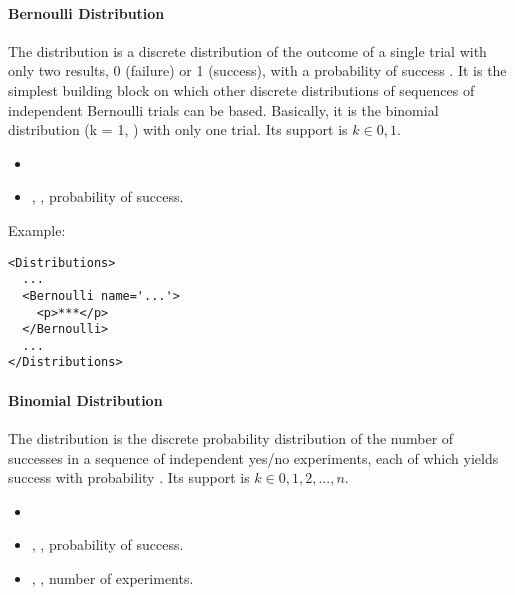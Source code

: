 \paragraph{Bernoulli Distribution}
\label{Bernoulli}
The  distribution is a discrete distribution of the outcome
of a single trial with only two results, 0 (failure) or 1 (success), with a
probability of success .
%
It is the simplest building block on which other discrete distributions of
sequences of independent Bernoulli trials can be based.
%
Basically, it is the binomial distribution (k = 1, ) with only
one trial.
%
Its support is $k \in {0, 1}$.

%
\attrIntro
\vspace{-5mm}
\begin{itemize}
\itemsep0em
\item \nameDescription   
\end{itemize}
\vspace{-5mm}
\subnodeIntro
\begin{itemize}
\item {}, , probability of success.
 \end{itemize}
Example:
\begin{lstlisting}[style=XML]
<Distributions>
  ...
  <Bernoulli name='...'>
    <p>***</p>
  </Bernoulli>
  ...
</Distributions>
\end{lstlisting}

\paragraph{Binomial Distribution}
\label{Binomial}
The  distribution is the discrete probability distribution of
the number of successes in a sequence of  independent yes/no
experiments, each of which yields success with probability .
%
Its support is $k \in {0, 1, 2, ..., n}$.

%
\attrIntro
\vspace{-5mm}
\begin{itemize}
\itemsep0em
\item \nameDescription   
\end{itemize}
\vspace{-5mm}
\subnodesIntro
\begin{itemize}
\item {}, ,  probability of success.
\item {}, , number of experiments.
\end{itemize}

